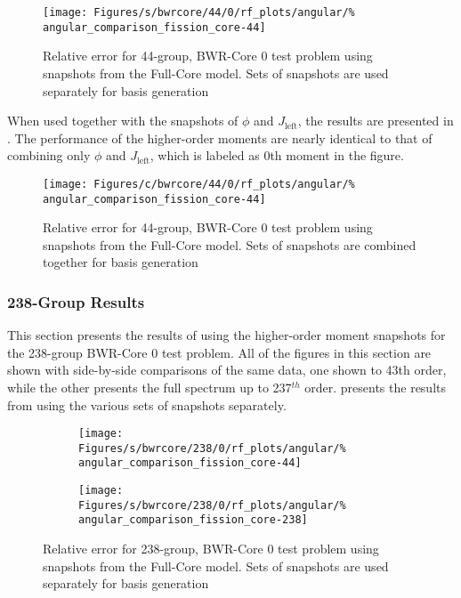 \begin{figure*}[tb]
    \centering
    \texttt{[image: Figures/s/bwrcore/44/0/rf\_plots/angular/\%
        angular\_comparison\_fission\_core-44]}
    \caption{Relative error for 44-group, BWR-Core 0 test problem using 
        snapshots from the Full-Core model.  Sets of snapshots are 
        used separately for basis generation}
    \label{fig:BWR0-core-single}
\end{figure*}

When used together with the snapshots of $\phi$ and $J_{\text{left}}$, the 
results are presented in .  The 
performance of the higher-order moments are nearly identical to that of 
combining only $\phi$ and $J_{\text{left}}$, which is labeled as 0th moment in 
the figure.

\begin{figure*}[tb]
    \centering
    \texttt{[image: Figures/c/bwrcore/44/0/rf\_plots/angular/\%
        angular\_comparison\_fission\_core-44]}
    \caption{Relative error for 44-group, BWR-Core 0 test problem using 
        snapshots from the Full-Core model.  Sets of snapshots are combined 
        together for basis generation}
    \label{fig:BWR0-core-combined}
\end{figure*}

\subsubsection{238-Group Results}

This section presents the results of using the higher-order moment snapshots 
for the 238-group BWR-Core 0 test problem.  All of the figures in 
this section are shown with side-by-side comparisons of the same data, one 
shown to 43th order, while the other presents the full spectrum up to 
237$^{th}$ order.   presents the results 
from using the various sets of snapshots separately.

\begin{figure*}[tb]
    \centering
    \begin{subfigure}{0.5\textwidth}
        \centering
        \texttt{[image: Figures/s/bwrcore/238/0/rf\_plots/angular/\%
            angular\_comparison\_fission\_core-44]}
    \end{subfigure}%
    \begin{subfigure}{0.5\textwidth}
        \centering
        \texttt{[image: Figures/s/bwrcore/238/0/rf\_plots/angular/\%
            angular\_comparison\_fission\_core-238]}
    \end{subfigure}
    \caption{Relative error for 238-group, BWR-Core 0 test problem using 
        snapshots from the Full-Core model.  Sets of snapshots are 
        used separately for basis generation}
    \label{fig:BWR0-core-single-238}
\end{figure*}

